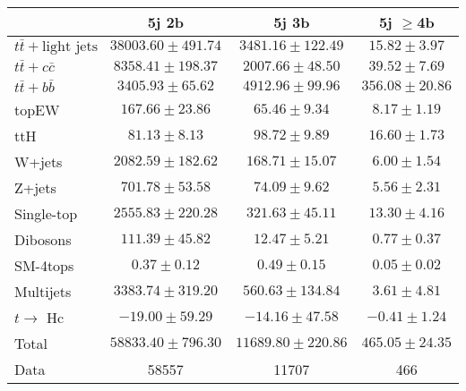 \begin{table}
\begin{center}
  \begin{tabular}{ | l |  c |  c |  c | }
    \hline \hline 
     & 5j 2b  & 5j 3b  & 5j $\geq$4b  \\ 
    \hline 
     $t\bar{t}+\text{light jets}$  &   $ 38003.60 \pm 491.74 $ &   $ 3481.16 \pm 122.49 $ &   $ 15.82 \pm 3.97 $ \\ 
     $t\bar{t}+c\bar{c}$  &   $ 8358.41 \pm 198.37 $ &   $ 2007.66 \pm 48.50 $ &   $ 39.52 \pm 7.69 $ \\ 
     $t\bar{t}+b\bar{b}$  &   $ 3405.93 \pm 65.62 $ &   $ 4912.96 \pm 99.96 $ &   $ 356.08 \pm 20.86 $ \\ 
    topEW  &   $ 167.66 \pm 23.86 $ &   $ 65.46 \pm 9.34 $ &   $ 8.17 \pm 1.19 $ \\ 
    ttH  &   $ 81.13 \pm 8.13 $ &   $ 98.72 \pm 9.89 $ &   $ 16.60 \pm 1.73 $ \\ 
    W+jets  &   $ 2082.59 \pm 182.62 $ &   $ 168.71 \pm 15.07 $ &   $ 6.00 \pm 1.54 $ \\ 
    Z+jets  &   $ 701.78 \pm 53.58 $ &   $ 74.09 \pm 9.62 $ &   $ 5.56 \pm 2.31 $ \\ 
    Single-top  &   $ 2555.83 \pm 220.28 $ &   $ 321.63 \pm 45.11 $ &   $ 13.30 \pm 4.16 $ \\ 
    Dibosons  &   $ 111.39 \pm 45.82 $ &   $ 12.47 \pm 5.21 $ &   $ 0.77 \pm 0.37 $ \\ 
    SM-4tops  &   $ 0.37 \pm 0.12 $ &   $ 0.49 \pm 0.15 $ &   $ 0.05 \pm 0.02 $ \\ 
    Multijets  &   $ 3383.74 \pm 319.20 $ &   $ 560.63 \pm 134.84 $ &   $ 3.61 \pm 4.81 $ \\ 
     $t\rightarrow$ Hc  &   $ -19.00 \pm 59.29 $ &   $ -14.16 \pm 47.58 $ &   $ -0.41 \pm 1.24 $ \\ 
    Total  &   $ 58833.40 \pm 796.30 $ &   $ 11689.80 \pm 220.86 $ &   $ 465.05 \pm 24.35 $ \\ 
    \hline 
    Data  & 58557  & 11707  & 466  \\ 
    \hline \hline 
  \end{tabular} 



\end{center}
\end{table}
